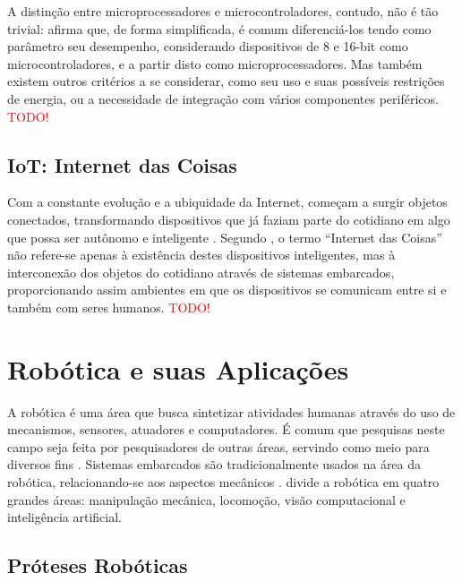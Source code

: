 A distinção entre microprocessadores e microcontroladores, contudo, não é tão trivial:  afirma que, de forma simplificada, é comum diferenciá-los tendo como parâmetro seu desempenho, considerando dispositivos de 8 e 16-bit como microcontroladores, e a partir disto como microprocessadores. Mas também existem outros critérios a se considerar, como seu uso e suas possíveis restrições de energia, ou a necessidade de integração com vários componentes periféricos.
\textcolor{red}{TODO!}

\subsection{IoT: Internet das Coisas}
Com a constante evolução e a ubiquidade da Internet, começam a surgir objetos conectados, transformando dispositivos que já faziam parte do cotidiano em algo que possa ser autônomo e inteligente \cite{kopetz:2011}.  Segundo , o termo ``Internet das Coisas''  não refere-se apenas à existência destes dispositivos inteligentes, mas à interconexão dos objetos do cotidiano através de sistemas embarcados, proporcionando assim ambientes em que os dispositivos se comunicam entre si e também com seres humanos. 
\textcolor{red}{TODO!}



\section{Robótica e suas Aplicações}
\label{sec:robotica}
A robótica é uma área que busca sintetizar atividades humanas através do uso de mecanismos, sensores, atuadores e computadores. É comum que pesquisas neste campo seja feita por pesquisadores de outras áreas, servindo como meio para diversos fins \cite{craig:2005}. Sistemas embarcados são tradicionalmente usados na área da robótica, relacionando-se aos aspectos mecânicos \cite{marwedel:2010}.  divide a robótica em quatro grandes áreas: manipulação mecânica, locomoção, visão computacional e inteligência artificial.

\subsection{Próteses Robóticas}


